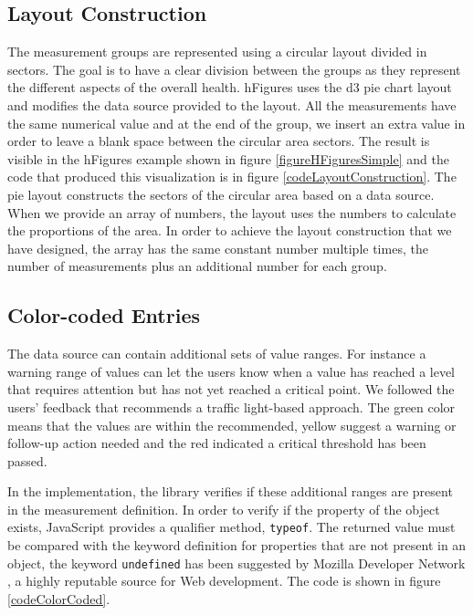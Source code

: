 \documentclass[twocolumn]{bmcart}%
\begin{document}
\subsection*{Layout Construction}

The measurement groups are represented using a circular layout divided in sectors. The goal is to have a clear division between the groups as they represent the different aspects of the overall health. hFigures uses the d3 pie chart layout and modifies the data source provided to the layout. All the measurements have the same numerical value and at the end of the group, we insert an extra value in order to leave a blank space between the circular area sectors. The result is visible in the hFigures example shown in figure \ref{figureHFiguresSimple} and the code that produced this visualization is in figure \ref{codeLayoutConstruction}. The pie layout constructs the sectors of the circular area based on a data source. When we provide an array of numbers, the layout uses the numbers to calculate the proportions of the area. In order to achieve the layout construction that we have designed, the array has the same constant number multiple times, the number of measurements plus an additional number for each group. 

\subsection*{Color-coded Entries}

The data source can contain additional sets of value ranges. For instance a warning range of values can let the users know when a value has reached a level that requires attention but has not yet reached a critical point. We followed the users' feedback that recommends a traffic light-based approach. The green color means that the values are within the recommended, yellow suggest a warning or follow-up action needed and the red indicated a critical threshold has been passed.

In the implementation, the library verifies if these additional ranges are present in the measurement definition. In order to verify if the property of the object exists, JavaScript provides a qualifier method, \texttt{typeof}. The returned value must be compared with the keyword definition for properties that are not present in an object, the keyword \texttt{undefined} has been suggested by Mozilla Developer Network \cite{MDNJS}, a highly reputable source for Web development. The code is shown in figure \ref{codeColorCoded}.
\end{document}
